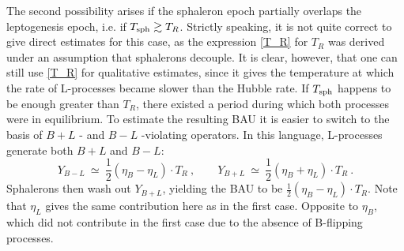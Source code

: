 \documentclass[12pt]{revtex4}
\newcommand{\Tsph}{T_{\rm sph}}
\begin{document}

	The second possibility arises if the sphaleron epoch partially
	overlaps the leptogenesis epoch, i.e. if $ \Tsph \gtrsim T_R $.
	Strictly speaking, it is not quite correct to give direct
	estimates for this case, as the expression \eqref{T_R} for $ T_R $
	was derived under an assumption that sphalerons decouple.
	It is clear, however, that one can still use \eqref{T_R} for
	qualitative estimates, since it gives the temperature at which
	the rate of L-processes became slower than the Hubble rate.
	If $ \Tsph $ happens to be enough greater than $ T_R $, there
	existed a period during which both processes were in equilibrium.
	To estimate the resulting BAU it is easier to switch to the
	basis of $ B + L $ - and $ B - L $ -violating operators.
	In this language, L-processes generate both  $ B + L $ and $ B - L $:
\[
	Y_{B-L} ~\simeq~ \frac 12 (\eta_B - \eta_L ) \cdot T_R~,\qquad
	Y_{B+L} ~\simeq~ \frac 12 (\eta_B + \eta_L ) \cdot T_R~.
\]	
	Sphalerons then wash out $ Y_{B+L} $, yielding the BAU to be
	$ \frac 12 (\eta_B - \eta_L ) \cdot T_R $.
	Note that $ \eta_L $ gives the same contribution here as in the 
	first case.
	Opposite to $ \eta_B $, which did not contribute in the first case
	due to the absence of B-flipping processes.
	
\end{document}
